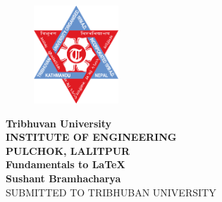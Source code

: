 \documentclass{report}
\begin{document}
\begin{figure}
    \centering
    \includegraphics[width=1.25in]{tu.png}
\end{figure}
\begin{center}
    {\fontsize{14pt}{28}\selectfont%
    \textbf{Tribhuvan University\\
    INSTITUTE OF ENGINEERING\\
     PULCHOK, LALITPUR\\
    \vspace{0.5in}
    Fundamentals to \LaTeX\\
    \vspace{0.75in}
    Sushant Bramhacharya}\\
    \vspace{0.75in}
    SUBMITTED TO TRIBHUBAN UNIVERSITY\\
    
    }
\end{center}
\end{document}
